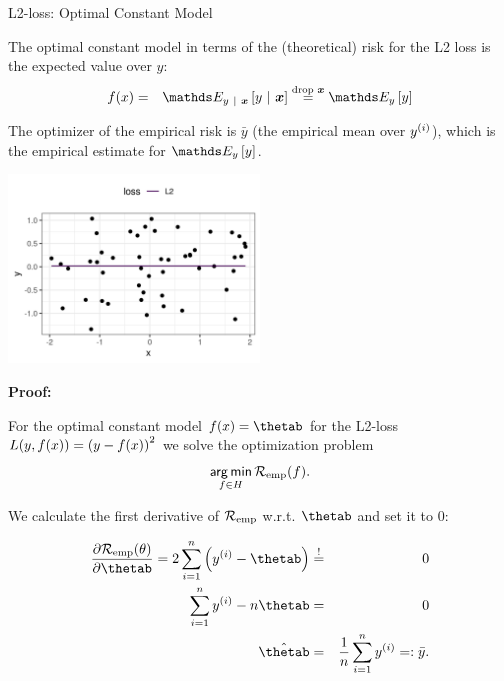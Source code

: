 \begin{vbframe}{L2-loss: Optimal Constant Model}

The optimal constant model in terms of the (theoretical) risk for the L2 loss is the expected value over $y$: 
  \begin{eqnarray*}
    \fx &=& \E_{y~|~\xv}\left[y~|~\xv\right] \overset{\text{drop } \xv}{=} \E_y \left[y\right] 
  \end{eqnarray*} 

The optimizer of the empirical risk is $\bar y$ (the empirical mean over $y^{(i)}$), which is the empirical estimate for $\E_y \left[y\right]$. 

\begin{center}
\includegraphics[width = 0.5\textwidth ]{figure_man/L2-loss.png} \\
\end{center}

\framebreak 

\textbf{Proof: }

\vspace{0.2cm}

For the optimal constant model $\fx = \thetab$ for the L2-loss $L(y, f(x)) = \left(y - f(x)\right)^2$ we solve the optimization problem 
$$
  \mathop{\sf arg\,min}_{f \in H} \mathcal{R}_{\text{emp}}(f). 
$$


We calculate the first derivative of $\mathcal{R}_{\text{emp}}$ w.r.t. $\thetab$ and set it to $0$: 


\begin{eqnarray*}
\frac{\partial \risket}{\partial \thetab} = 2 \sumin \left(\yi - \thetab\right) &\overset{!}{=}& 0 \\
\sumin \yi - n \thetab&=& 0 \\
\hat \thetab&=& \frac{1}{n} \sumin \yi =: \bar y.
\end{eqnarray*}


\end{vbframe}




\endlecture

